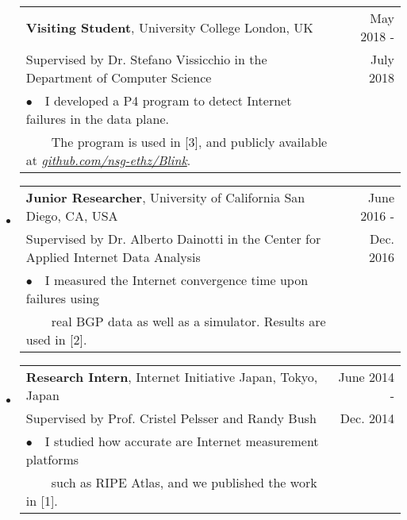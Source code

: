 \documentclass[letterpaper,11pt]{article}
\begin{document}
\begin{itemize}[label={},leftmargin=3mm]
    \begin{tabular*}{6.5in}{l@{\cftdotfill{\cftsecdotsep}\extracolsep{\fill}}r}
    		\sffamily \textbf{Visiting Student}, University College London, UK  & \sffamily May 2018 - \\
            \sffamily Supervised by Dr. Stefano Vissicchio in the Department of Computer Science & \sffamily July 2018\\
    		\sffamily $\bullet$~~I developed a P4 program to detect Internet failures in the data plane.  & \\
    		\sffamily ~~~~The program is used in [3], and publicly available at \href{https://github.com/nsg-ethz/Blink}{\textit{github.com/nsg-ethz/Blink}}. & \\
    \end{tabular*}\vspace{-6pt}

\item

    \begin{tabular*}{6.5in}{l@{\cftdotfill{\cftsecdotsep}\extracolsep{\fill}}r}
    		\sffamily \textbf{Junior Researcher}, University of California San Diego, CA, USA & \sffamily June 2016 - \\
            \sffamily Supervised by Dr. Alberto Dainotti in the Center for Applied Internet Data Analysis & \sffamily Dec. 2016\\
    		\sffamily $\bullet$~~I measured the Internet convergence time upon failures using & \\
    		\sffamily ~~~~real BGP data as well as a simulator. Results are used in [2].  & \\

    \end{tabular*}\vspace{-6pt}

\item

    \begin{tabular*}{6.5in}{l@{\cftdotfill{\cftsecdotsep}\extracolsep{\fill}}r}
    		\sffamily \textbf{Research Intern}, Internet Initiative Japan, Tokyo, Japan & \sffamily June 2014 - \\
    		\sffamily Supervised by Prof. Cristel Pelsser and Randy Bush & \sffamily Dec. 2014\\
    		\sffamily $\bullet$~~I studied how accurate are Internet measurement platforms  & \\
    		\sffamily ~~~~such as RIPE Atlas, and we published the work in [1].  & \\
    \end{tabular*}\vspace{-6pt}


\end{itemize}
\end{document}
